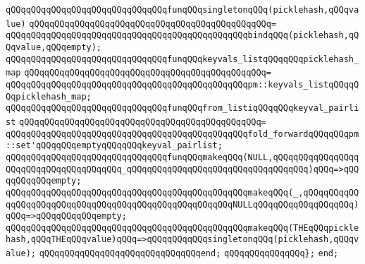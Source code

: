 \verb|qQQqqQQqqQQqqQQqqQQqqQQqqQQqqQQqfunqQQqsingletonqQQq(picklehash,qQQqvalue)|\newline
\verb|qQQqqQQqqQQqqQQqqQQqqQQqqQQqqQQqqQQqqQQqqQQqqQQq=|\newline
\verb|qQQqqQQqqQQqqQQqqQQqqQQqqQQqqQQqqQQqqQQqqQQqqQQqbindqQQq(picklehash,qQQqvalue,qQQqempty);|\newline
\newline
\newline
\verb|qQQqqQQqqQQqqQQqqQQqqQQqqQQqqQQqfunqQQqkeyvals_listqQQqqQQqpicklehash_map|\newline
\verb|qQQqqQQqqQQqqQQqqQQqqQQqqQQqqQQqqQQqqQQqqQQqqQQq=|\newline
\verb|qQQqqQQqqQQqqQQqqQQqqQQqqQQqqQQqqQQqqQQqqQQqqQQqpm::keyvals_listqQQqqQQqpicklehash_map;|\newline
\newline
\newline
\verb|qQQqqQQqqQQqqQQqqQQqqQQqqQQqqQQqfunqQQqfrom_listiqQQqqQQqkeyval_pairlist|\newline
\verb|qQQqqQQqqQQqqQQqqQQqqQQqqQQqqQQqqQQqqQQqqQQqqQQq=|\newline
\verb|qQQqqQQqqQQqqQQqqQQqqQQqqQQqqQQqqQQqqQQqqQQqqQQqfold_forwardqQQqqQQqpm::set'qQQqqQQqemptyqQQqqQQqkeyval_pairlist;|\newline
\newline
\newline
\verb|qQQqqQQqqQQqqQQqqQQqqQQqqQQqqQQqfunqQQqmakeqQQq(NULL,qQQqqQQqqQQqqQQqqQQqqQQqqQQqqQQqqQQqqQQq_qQQqqQQqqQQqqQQqqQQqqQQqqQQqqQQqqQQq)qQQq=>qQQqqQQqqQQqempty;|\newline
\verb|qQQqqQQqqQQqqQQqqQQqqQQqqQQqqQQqqQQqqQQqqQQqqQQqmakeqQQq(_,qQQqqQQqqQQqqQQqqQQqqQQqqQQqqQQqqQQqqQQqqQQqqQQqqQQqqQQqNULLqQQqqQQqqQQqqQQqqQQq)qQQq=>qQQqqQQqqQQqempty;|\newline
\verb|qQQqqQQqqQQqqQQqqQQqqQQqqQQqqQQqqQQqqQQqqQQqqQQqmakeqQQq(THEqQQqpicklehash,qQQqTHEqQQqvalue)qQQq=>qQQqqQQqqQQqsingletonqQQq(picklehash,qQQqvalue);|\newline
\verb|qQQqqQQqqQQqqQQqqQQqqQQqqQQqqQQqend;|\newline
\verb|qQQqqQQqqQQqqQQq};|\newline
\verb|end;|\newline

